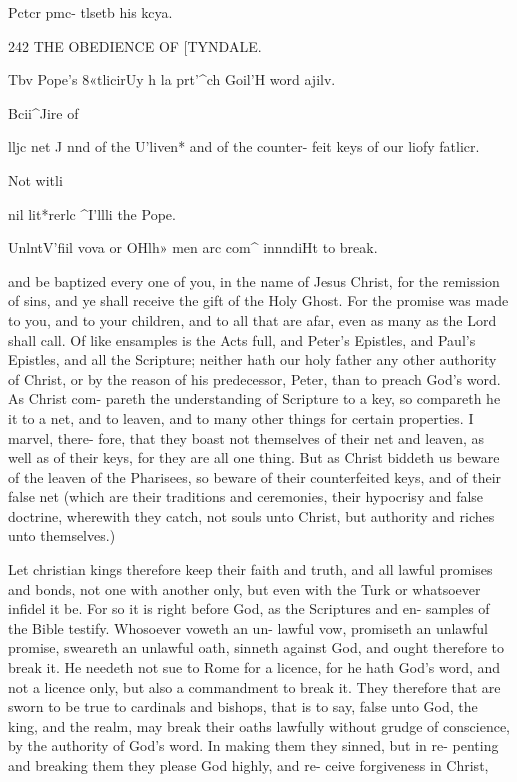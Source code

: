\documentclass{custom}
\begin{document}
{Pctcr pmc- 
tlsetb his 
kcya. 


242
THE OBEDIENCE OF
[TYNDALE.

Tbv Pope's 
8«tlicirUy 
h la prt'^ch 
Goil'H word 
ajilv. 

Bcii^Jire of 

lljc net J 
nnd of the 
U'liven* and 
of the 
counter- 
feit keys of 
our liofy 
fatlicr. 

Not witli 

nil lit*rerlc 
^I'llli the 
Pope. 

UnlntV'fiil 
vova or 
OHlh» men 
arc com^ 
innndiHt to 
break. 

and be baptized every one of you, in the name of Jesus 
Christ, for the remission of sins, and ye shall receive the 
gift of the Holy Ghost. For the promise was made to 
you, and to your children, and to all that are afar, even 
as many as the Lord shall call. Of like ensamples is the 
Acts full, and Peter's Epistles, and Paul's Epistles, and 
all the Scripture; neither hath our holy father any other 
authority of Christ, or by the reason of his predecessor, 
Peter, than to preach God's word. As Christ com- 
pareth the understanding of Scripture to a key, so 
compareth he it to a net, and to leaven, and to 
many other things for certain properties. I marvel, there- 
fore, that they boast not themselves of their net and 
leaven, as well as of their keys, for they are all one thing. 
But as Christ biddeth us beware of the leaven of the 
Pharisees, so beware of their counterfeited keys, and of 
their false net (which are their traditions and ceremonies, 
their hypocrisy and false doctrine, wherewith they catch, not 
souls unto Christ, but authority and riches unto themselves.) 

Let christian kings therefore keep their faith and truth, 
and all lawful promises and bonds, not one with another 
only, but even with the Turk or whatsoever infidel it be. 
For so it is right before God, as the Scriptures and en- 
samples of the Bible testify. Whosoever voweth an un- 
lawful vow, promiseth an unlawful promise, sweareth an 
unlawful oath, sinneth against God, and ought therefore 
to break it. He needeth not sue to Rome for a licence, 
for he hath God's word, and not a licence only, but also a 
commandment to break it. They therefore that are sworn 
to be true to cardinals and bishops, that is to say, false 
unto God, the king, and the realm, may break their oaths 
lawfully without grudge of conscience, by the authority of 
God's word. In making them they sinned, but in re- 
penting and breaking them they please God highly, and re- 
ceive forgiveness in Christ, 

}
\end{document}
